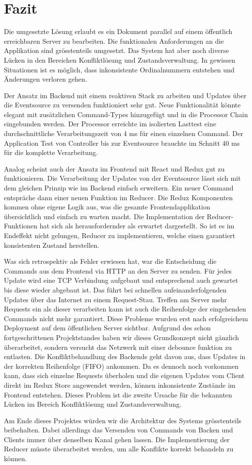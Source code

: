 \section{Fazit}

Die umgesetzte Lösung erlaubt es ein Dokument parallel auf einem öffentlich erreichbaren Server zu bearbeiten.
Die funktionalen Anforderungen an die Applikation sind grösstenteils umgesetzt.
Das System hat aber noch diverse Lücken in den Bereichen Konfliktlösung und Zustandsverwaltung.
In gewissen Situationen ist es möglich, dass inkonsistente Ordinalnummern entstehen und Änderungen verloren gehen.

Der Ansatz im Backend mit einem reaktiven Stack zu arbeiten und Updates über die Eventsource zu versenden funktioniert sehr gut.
Neue Funktionalität könnte elegant mit zusätzlichen Command-Types hinzugefügt und in die Processor Chain eingebunden werden.
Der Processor erreichte im isolierten Lasttest eine durchschnittliche Verarbeitungszeit von 4 ms für einen einzelnen Command.
Der Application Test von Controller bis zur Eventsource brauchte im Schnitt 40 ms für die komplette Verarbeitung.

Analog scheint auch der Ansatz im Frontend mit React und Redux gut zu funktionieren.
Die Verarbeitung der Updates von der Eventsource lässt sich mit dem gleichen Prinzip wie im Backend einfach erweitern.
Ein neuer Command entspräche dann einer neuen Funktion im Reducer.
Die Redux Komponenten kommen ohne eigene Logik aus, was die gesamte Frontendapplikation übersichtlich und einfach zu warten macht.
Die Implementation der Reducer-Funktionen hat sich als herausfordernder als erwartet dargestellt.
So ist es im Endeffekt nicht gelungen, Reducer zu implementieren, welche einen garantiert konsistenten Zustand herstellen.

Was sich retrospektiv als Fehler erwiesen hat, war die Entscheidung die Commands aus dem Frontend via HTTP an den Server zu senden.
Für jedes Update wird eine TCP Verbindung aufgebaut und entsprechend auch gewartet bis diese wieder abgebaut ist.
Das führt bei schnellen aufeinanderfolgenden Updates über das Internet zu einem Request-Stau.
Treffen am Server mehr Requests ein als dieser verarbeiten kann ist auch die Reihenfolge der eingehenden Commands nicht mehr garantiert.
Diese Probleme wurden erst nach erfolgreichem Deployment auf dem öffentlichen Server sichtbar.
Aufgrund des schon fortgeschrittenen Projektstandes haben wir dieses Grundkonzept nicht gänzlich überarbeitet, sondern versucht das Netzwerk mit einer debounce funktion zu entlasten.
Die Konfliktbehandlung des Backends geht davon aus, dass Updates in der korrekten Reihenfolge (FIFO) ankommen.
Da es dennoch noch vorkommen kann, dass sich einzelne Requests überholen und die eigenen Updates vom Client direkt im Redux Store angewendet werden, können inkonsistente Zustände im Frontend entstehen.
Dieses Problem ist die zweite Ursache für die bekannten Lücken im Bereich Konfliktlösung und Zustandsverwaltung.

Am Ende dieses Projektes würden wir die Architektur des Systems grösstenteils beibehalten.
Dabei allerdings das Versenden von Commands von Backen und Clients immer über denselben Kanal gehen lassen.
Die Implementierung der Reducer müsste überarbeitet werden, um alle Konflikte korrekt behandeln zu können.
